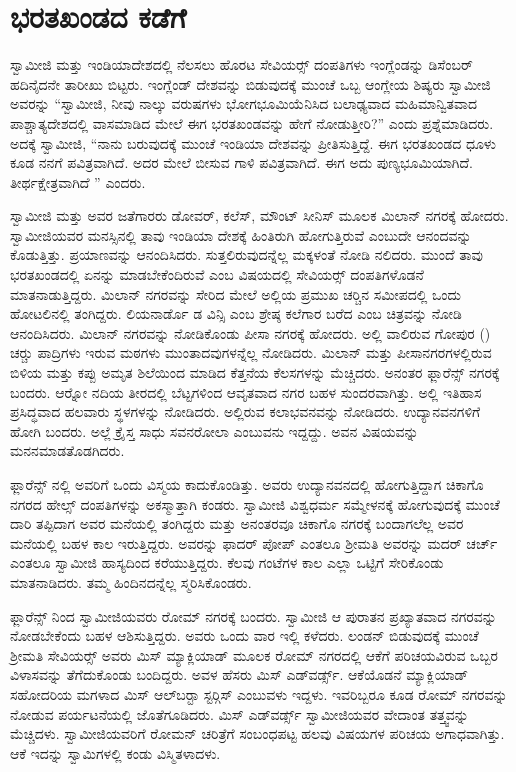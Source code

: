 
\chapter{ಭರತಖಂಡದ ಕಡೆಗೆ }

 ಸ್ವಾಮೀಜಿ ಮತ್ತು ಇಂಡಿಯಾದೇಶದಲ್ಲಿ ನೆಲಸಲು ಹೊರಟ ಸೇವಿಯರ್ಸ್‍‍ ದಂಪತಿಗಳು ಇಂಗ್ಲೆಂಡನ್ನು ಡಿಸೆಂಬರ್ ಹದಿನೈದನೇ ತಾರೀಖು ಬಿಟ್ಟರು. ಇಂಗ್ಲೆಂಡ್ ದೇಶವನ್ನು ಬಿಡುವುದಕ್ಕೆ ಮುಂಚೆ ಒಬ್ಬ ಆಂಗ್ಲೇಯ ಶಿಷ್ಯರು ಸ್ವಾಮೀಜಿ ಅವರನ್ನು “ಸ್ವಾಮೀಜಿ, ನೀವು ನಾಲ್ಕು ವರುಷಗಳು ಭೋಗಭೂಮಿಯೆನಿಸಿದ ಬಲಾಢ್ಯವಾದ ಮಹಿಮಾನ್ವಿತವಾದ ಪಾಶ್ಚಾತ್ಯದೇಶದಲ್ಲಿ ವಾಸಮಾಡಿದ ಮೇಲೆ ಈಗ ಭರತಖಂಡವನ್ನು ಹೇಗೆ ನೋಡುತ್ತೀರಿ?” ಎಂದು ಪ್ರಶ್ನೆಮಾಡಿದರು. ಅದಕ್ಕೆ ಸ್ವಾಮೀಜಿ, “ನಾನು ಬರುವುದಕ್ಕೆ ಮುಂಚೆ ಇಂಡಿಯಾ ದೇಶವನ್ನು ಪ್ರೀತಿಸುತ್ತಿದ್ದೆ. ಈಗ ಭರತಖಂಡದ ಧೂಳು ಕೂಡ ನನಗೆ ಪವಿತ್ರವಾಗಿದೆ. ಅದರ ಮೇಲೆ ಬೀಸುವ ಗಾಳಿ ಪವಿತ್ರವಾಗಿದೆ. ಈಗ ಅದು ಪುಣ್ಯಭೂಮಿಯಾಗಿದೆ. ತೀರ್ಥಕ್ಷೇತ್ರವಾಗಿದೆ ” ಎಂದರು. 

 ಸ್ವಾಮೀಜಿ ಮತ್ತು ಅವರ ಜತೆಗಾರರು ಡೋವರ್, ಕಲೆಸ್, ಮೌಂಟ್ ಸೀನಿಸ್ ಮೂಲಕ ಮಿಲಾನ್ ನಗರಕ್ಕೆ ಹೋದರು. ಸ್ವಾಮೀಜಿಯವರ ಮನಸ್ಸಿನಲ್ಲಿ ತಾವು ಇಂಡಿಯಾ ದೇಶಕ್ಕೆ ಹಿಂತಿರುಗಿ ಹೋಗುತ್ತಿರುವೆ ಎಂಬುದೇ ಆನಂದವನ್ನು ಕೊಡುತ್ತಿತ್ತು. ಪ್ರಯಾಣವನ್ನು ಆನಂದಿಸಿದರು. ಸುತ್ತಲಿರುವುದನ್ನೆಲ್ಲ ಮಕ್ಕಳಂತೆ ನೋಡಿ ನಲಿದರು. ಮುಂದೆ ತಾವು ಭರತಖಂಡದಲ್ಲಿ ಏನನ್ನು ಮಾಡಬೇಕೆಂದಿರುವೆ ಎಂಬ ವಿಷಯದಲ್ಲಿ ಸೇವಿಯರ್ಸ್‍‍ ದಂಪತಿಗಳೊಡನೆ ಮಾತನಾಡುತ್ತಿದ್ದರು. ಮಿಲಾನ್ ನಗರವನ್ನು ಸೇರಿದ ಮೇಲೆ ಅಲ್ಲಿಯ ಪ್ರಮುಖ ಚರ‍್ಚಿನ ಸಮೀಪದಲ್ಲಿ ಒಂದು ಹೋಟಲಿನಲ್ಲಿ ತಂಗಿದ್ದರು. ಲಿಯನಾರ್ಡೊ ಡ ವಿನ್ಸಿ ಎಂಬ ಶ್ರೇಷ್ಠ ಕಲೆಗಾರ ಬರೆದ  ಎಂಬ ಚಿತ್ರವನ್ನು ನೋಡಿ ಆನಂದಿಸಿದರು. ಮಿಲಾನ್ ನಗರವನ್ನು ನೋಡಿಕೊಂಡು ಪೀಸಾ ನಗರಕ್ಕೆ ಹೋದರು. ಅಲ್ಲಿ ವಾಲಿರುವ ಗೋಪುರ () ಚರ‍್ಚು ಪಾದ್ರಿಗಳು ಇರುವ ಮಠಗಳು ಮುಂತಾದವುಗಳನ್ನೆಲ್ಲ ನೋಡಿದರು. ಮಿಲಾನ್ ಮತ್ತು ಪೀಸಾನಗರಗಳಲ್ಲಿರುವ ಬಿಳಿಯ ಮತ್ತು ಕಪ್ಪು ಅಮೃತ ಶಿಲೆಯಿಂದ ಮಾಡಿದ ಕೆತ್ತನೆಯ ಕೆಲಸಗಳನ್ನು ಮೆಚ್ಚಿದರು. ಅನಂತರ ಫ್ಲಾರೆನ್ಸ್ ನಗರಕ್ಕೆ ಬಂದರು. ಆರ‍್ನೋ ನದಿಯ ತೀರದಲ್ಲಿ ಬೆಟ್ಟಗಳಿಂದ ಆವೃತವಾದ ನಗರ ಬಹಳ ಸುಂದರವಾಗಿತ್ತು. ಅಲ್ಲಿ ಇತಿಹಾಸ ಪ್ರಸಿದ್ಧವಾದ ಹಲವಾರು ಸ್ಥಳಗಳನ್ನು ನೋಡಿದರು. ಅಲ್ಲಿರುವ ಕಲಾಭವನವನ್ನು ನೋಡಿದರು. ಉದ್ಯಾನವನಗಳಿಗೆ ಹೋಗಿ ಬಂದರು. ಅಲ್ಲೆ ಕ್ರೈಸ್ತ ಸಾಧು ಸವನರೋಲಾ ಎಂಬುವನು ಇದ್ದದ್ದು. ಅವನ ವಿಷಯವನ್ನು ಮನನಮಾಡತೊಡಗಿದರು. 

 ಫ್ಲಾರೆನ್ಸ್ ನಲ್ಲಿ ಅವರಿಗೆ ಒಂದು ವಿಸ್ಮಯ ಕಾದುಕೊಂಡಿತ್ತು. ಅವರು ಉದ್ಯಾನವನದಲ್ಲಿ ಹೋಗುತ್ತಿದ್ದಾಗ ಚಿಕಾಗೊ ನಗರದ ಹೇಲ್ಸ್ ದಂಪತಿಗಳನ್ನು ಅಕಸ್ಮಾತ್ತಾಗಿ ಕಂಡರು. ಸ್ವಾಮೀಜಿ ವಿಶ್ವಧರ್ಮ ಸಮ್ಮೇಳನಕ್ಕೆ ಹೋಗುವುದಕ್ಕೆ ಮುಂಚೆ ದಾರಿ ತಪ್ಪಿದಾಗ ಅವರ ಮನೆಯಲ್ಲಿ ತಂಗಿದ್ದರು ಮತ್ತು ಅನಂತರವೂ ಚಿಕಾಗೊ ನಗರಕ್ಕೆ ಬಂದಾಗಲೆಲ್ಲ ಅವರ ಮನೆಯಲ್ಲಿ ಬಹಳ ಕಾಲ ಇರುತ್ತಿದ್ದರು. ಅವರನ್ನು ಫಾದರ್ ಪೋಪ್ ಎಂತಲೂ ಶ‍್ರೀಮತಿ ಅವರನ್ನು ಮದರ್ ಚರ್ಚ್ ಎಂತಲೂ ಸ್ವಾಮೀಜಿ ಹಾಸ್ಯದಿಂದ ಕರೆಯುತ್ತಿದ್ದರು. ಕೆಲವು ಗಂಟೆಗಳ ಕಾಲ ಎಲ್ಲಾ ಒಟ್ಟಿಗೆ ಸೇರಿಕೊಂಡು ಮಾತನಾಡಿದರು. ತಮ್ಮ ಹಿಂದಿನದನ್ನೆಲ್ಲ ಸ್ಮರಿಸಿಕೊಂಡರು. 

 ಫ್ಲಾರೆನ್ಸ್ ನಿಂದ ಸ್ವಾಮೀಜಿಯವರು ರೋಮ್ ನಗರಕ್ಕೆ ಬಂದರು. ಸ್ವಾಮೀಜಿ ಆ ಪುರಾತನ ಪ್ರಖ್ಯಾತವಾದ ನಗರವನ್ನು ನೋಡಬೇಕೆಂದು ಬಹಳ ಆಶಿಸುತ್ತಿದ್ದರು. ಅವರು ಒಂದು ವಾರ ಇಲ್ಲಿ ಕಳೆದರು. ಲಂಡನ್ ಬಿಡುವುದಕ್ಕೆ ಮುಂಚೆ ಶ‍್ರೀಮತಿ ಸೇವಿಯರ್ಸ್‍‍ ಅವರು ಮಿಸ್ ಮ್ಯಾಕ್ಲಿಯಾಡ್ ಮೂಲಕ ರೋಮ್ ನಗರದಲ್ಲಿ ಆಕೆಗೆ ಪರಿಚಯವಿರುವ ಒಬ್ಬರ ವಿಳಾಸವನ್ನು ತೆಗೆದುಕೊಂಡು ಬಂದಿದ್ದರು. ಅವಳ ಹೆಸರು ಮಿಸ್ ಎಡ್‍ವರ್ಡ್ಸ್. ಆಕೆಯೊಡನೆ ಮ್ಯಾಕ್ಲಿಯಾಡ್ ಸಹೋದರಿಯ ಮಗಳಾದ ಮಿಸ್ ಆಲ್‍ಬರ‍್ಟಾ ಸ್ಟರ್‍ಗಿಸ್ ಎಂಬುವಳು ಇದ್ದಳು. ಇವರಿಬ್ಬರೂ ಕೂಡ ರೋಮ್ ನಗರವನ್ನು ನೋಡುವ ಪರ್ಯಟನೆಯಲ್ಲಿ ಜೊತೆಗೂಡಿದರು. ಮಿಸ್ ಎಡ್‍ವರ್ಡ್ಸ್ ಸ್ವಾಮೀಜಿಯವರ ವೇದಾಂತ ತತ್ತ್ವವನ್ನು ಮೆಚ್ಚಿದಳು. ಸ್ವಾಮೀಜಿಯವರಿಗೆ ರೋಮನ್ ಚರಿತ್ರೆಗೆ ಸಂಬಂಧಪಟ್ಟ ಹಲವು ವಿಷಯಗಳ ಪರಿಚಯ ಅಗಾಧವಾಗಿತ್ತು. ಆಕೆ ಇದನ್ನು ಸ್ವಾಮಿಗಳಲ್ಲಿ ಕಂಡು ವಿಸ್ಮಿತಳಾದಳು. 

